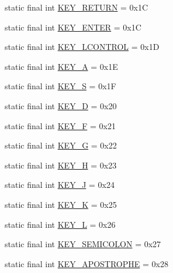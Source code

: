 \begin{DoxyCompactItemize}
static final int \mbox{\hyperlink{classorg_1_1newdawn_1_1slick_1_1_input_a83820cbb615b71235e0170b68fb05ec5}{K\+E\+Y\+\_\+\+R\+E\+T\+U\+RN}} = 0x1C
\item 
static final int \mbox{\hyperlink{classorg_1_1newdawn_1_1slick_1_1_input_aa02910bcd1f36d05132c68b97ed2a821}{K\+E\+Y\+\_\+\+E\+N\+T\+ER}} = 0x1C
\item 
static final int \mbox{\hyperlink{classorg_1_1newdawn_1_1slick_1_1_input_acc3005f370b8badff03d90c7555581a4}{K\+E\+Y\+\_\+\+L\+C\+O\+N\+T\+R\+OL}} = 0x1D
\item 
static final int \mbox{\hyperlink{classorg_1_1newdawn_1_1slick_1_1_input_a87d8db42a3c15917d48c0878b087d89c}{K\+E\+Y\+\_\+A}} = 0x1E
\item 
static final int \mbox{\hyperlink{classorg_1_1newdawn_1_1slick_1_1_input_a062e4c3f580addecf9179c44b57720d8}{K\+E\+Y\+\_\+S}} = 0x1F
\item 
static final int \mbox{\hyperlink{classorg_1_1newdawn_1_1slick_1_1_input_a1b3e9efa2a4205a16e46206b8dd29bcc}{K\+E\+Y\+\_\+D}} = 0x20
\item 
static final int \mbox{\hyperlink{classorg_1_1newdawn_1_1slick_1_1_input_a1920dae274a7966cf9049d9ffb62f223}{K\+E\+Y\+\_\+F}} = 0x21
\item 
static final int \mbox{\hyperlink{classorg_1_1newdawn_1_1slick_1_1_input_a139be68bc8eecf70710eb9d80164fd75}{K\+E\+Y\+\_\+G}} = 0x22
\item 
static final int \mbox{\hyperlink{classorg_1_1newdawn_1_1slick_1_1_input_a8216df6c9a70e9332c060c073f4bb04d}{K\+E\+Y\+\_\+H}} = 0x23
\item 
static final int \mbox{\hyperlink{classorg_1_1newdawn_1_1slick_1_1_input_a28557b0512c3e2d4dcac4cc4fbfd61cf}{K\+E\+Y\+\_\+J}} = 0x24
\item 
static final int \mbox{\hyperlink{classorg_1_1newdawn_1_1slick_1_1_input_ae37af766efea6bcdfe98a3ef7a7c632d}{K\+E\+Y\+\_\+K}} = 0x25
\item 
static final int \mbox{\hyperlink{classorg_1_1newdawn_1_1slick_1_1_input_a8c5ffbdf49b411acdf0ac378c70769b6}{K\+E\+Y\+\_\+L}} = 0x26
\item 
static final int \mbox{\hyperlink{classorg_1_1newdawn_1_1slick_1_1_input_a80a9c3416a54167476ea60ba44dbcc87}{K\+E\+Y\+\_\+\+S\+E\+M\+I\+C\+O\+L\+ON}} = 0x27
\item 
static final int \mbox{\hyperlink{classorg_1_1newdawn_1_1slick_1_1_input_a8359644678f98d3510a0f7f4a6efbc9e}{K\+E\+Y\+\_\+\+A\+P\+O\+S\+T\+R\+O\+P\+HE}} = 0x28
\item 

\end{DoxyCompactItemize}
